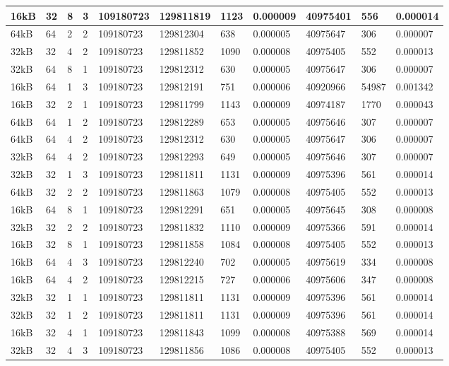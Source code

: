 \documentclass[conference]{IEEEtran}
\begin{document}
\begin{table}
\begin{tabular}{|m{.75cm} |m{.75cm} |m{.8cm} | m{.75cm} | l | l | l | l | l | l | l |}
16kB&	32&	8&	3&	109180723&	129811819&	1123&	0.000009	&40975401	  &556	  &0.000014 \\ \hline
64kB&	64&	2&	2&	109180723&	129812304&	638	&  0.000005&	40975647	&306	  &0.000007 \\ \hline
32kB&	32&	4&	2&	109180723&	129811852&	1090&	0.000008	&40975405	  &552	  &0.000013 \\ \hline
32kB&	64&	8&	1&	109180723&	129812312&	630	&  0.000005&	40975647	&306	  &0.000007 \\ \hline
16kB&	64&	1&	3&	109180723&	129812191&	751	&  0.000006&	40920966	&54987	&0.001342 \\ \hline
16kB&	32&	2&	1&	109180723&	129811799&	1143&	0.000009	&40974187	 & 1770	&0.000043 \\ \hline
64kB&	64&	1&	2&	109180723&	129812289&	653	&  0.000005&	40975646	&307	  &0.000007 \\ \hline
64kB&	64&	4&	2&	109180723&	129812312&	630	&  0.000005&	40975647	&306	  &0.000007 \\ \hline
32kB&	64&	4&	2&	109180723&	129812293&	649	&  0.000005&	40975646	&307	  &0.000007 \\ \hline
32kB&	32&	1&	3&	109180723&	129811811&	1131&	0.000009	&40975396	  &561	  &0.000014 \\ \hline
64kB&	32&	2&	2&	109180723&	129811863&	1079&	0.000008	&40975405	  &552	  &0.000013 \\ \hline
16kB&	64&	8&	1&	109180723&	129812291&	651	&  0.000005&	40975645	&308	  &0.000008 \\ \hline
32kB&	32&	2&	2&	109180723&	129811832&	1110&	0.000009	&40975366	  &591	  &0.000014 \\ \hline
16kB&	32&	8&	1&	109180723&	129811858&	1084&	0.000008	&40975405	  &552	  &0.000013 \\ \hline
16kB&	64&	4&	3&	109180723&	129812240&	702	&  0.000005&	40975619	&334	  &0.000008 \\ \hline
16kB&	64&	4&	2&	109180723&	129812215&	727	&  0.000006&	40975606	&347	  &0.000008 \\ \hline
32kB&	32&	1&	1&	109180723&	129811811&	1131&	0.000009	&40975396	  &561	  &0.000014 \\ \hline
32kB&	32&	1&	2&	109180723&	129811811&	1131&	0.000009	&40975396	  &561	  &0.000014 \\ \hline
16kB&	32&	4&	1&	109180723&	129811843&	1099&	0.000008	&40975388	  &569	  &0.000014 \\ \hline
32kB&	32&	4&	3&	109180723&	129811856&	1086&	0.000008	&40975405	  &552	  &0.000013 \\ \hline

\end{tabular}
\end{table}
\end{document}
